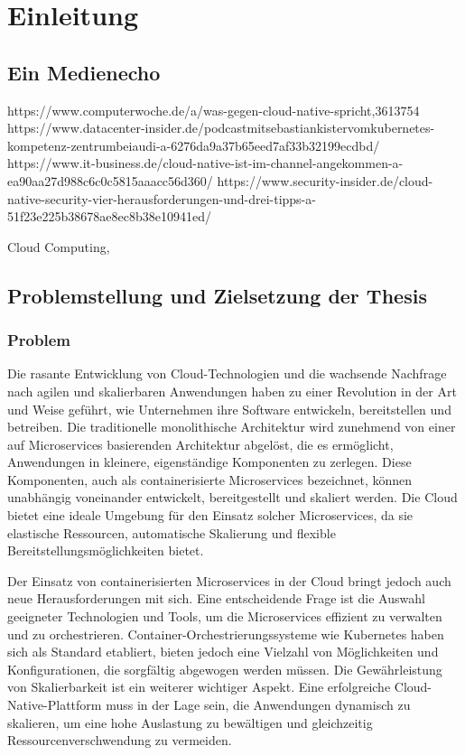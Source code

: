\newpage
\section{Einleitung}
\subsection{Ein Medienecho}
https://www.computerwoche.de/a/was-gegen-cloud-native-spricht,3613754
https://www.datacenter-insider.de/podcastmitsebastiankistervomkubernetes-kompetenz-zentrumbeiaudi-a-6276da9a37b65eed7af33b32199ecdbd/
https://www.it-business.de/cloud-native-ist-im-channel-angekommen-a-ea90aa27d988c6c0c5815aaacc56d360/
https://www.security-insider.de/cloud-native-security-vier-herausforderungen-und-drei-tipps-a-51f23e225b38678ae8ec8b38e10941ed/

Cloud Computing, 
\subsection{Problemstellung und Zielsetzung der Thesis}
\subsubsection{Problem}
Die rasante Entwicklung von Cloud-Technologien und die wachsende Nachfrage nach agilen und skalierbaren Anwendungen haben zu einer Revolution in der Art und Weise geführt, wie Unternehmen ihre Software entwickeln, bereitstellen und betreiben. Die traditionelle monolithische Architektur wird zunehmend von einer auf Microservices basierenden Architektur abgelöst, die es ermöglicht, Anwendungen in kleinere, eigenständige Komponenten zu zerlegen. Diese Komponenten, auch als containerisierte Microservices bezeichnet, können unabhängig voneinander entwickelt, bereitgestellt und skaliert werden. Die Cloud bietet eine ideale Umgebung für den Einsatz solcher Microservices, da sie elastische Ressourcen, automatische Skalierung und flexible Bereitstellungsmöglichkeiten bietet.

Der Einsatz von containerisierten Microservices in der Cloud bringt jedoch auch neue Herausforderungen mit sich. Eine entscheidende Frage ist die Auswahl geeigneter Technologien und Tools, um die Microservices effizient zu verwalten und zu orchestrieren. Container-Orchestrierungssysteme wie Kubernetes haben sich als Standard etabliert, bieten jedoch eine Vielzahl von Möglichkeiten und Konfigurationen, die sorgfältig abgewogen werden müssen. Die Gewährleistung von Skalierbarkeit ist ein weiterer wichtiger Aspekt. Eine erfolgreiche Cloud-Native-Plattform muss in der Lage sein, die Anwendungen dynamisch zu skalieren, um eine hohe Auslastung zu bewältigen und gleichzeitig Ressourcenverschwendung zu vermeiden.

